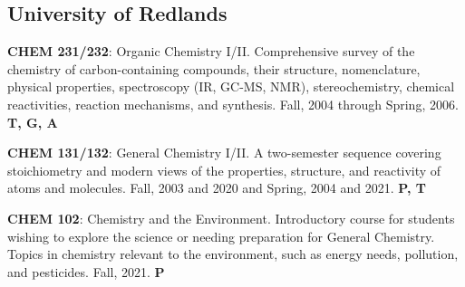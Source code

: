 \documentclass[11pt]{article}
\newcommand{\teitem}[4]{\textbf{#1}: #2 #3 \textbf{#4}}
\newcommand{\lectitem}[2]{\textbf{#1} #2}
\begin{document}
\subsection{University of Redlands}


\teitem{CHEM 231/232}{Organic Chemistry I/II. Comprehensive survey of the chemistry of carbon-containing compounds, their structure, nomenclature, physical properties, spectroscopy (IR, GC-MS, NMR), stereochemistry, chemical reactivities, reaction mechanisms, and synthesis.}{Fall, 2004 through Spring, 2006.}{T, G, A}

\teitem{CHEM 131/132}{General Chemistry I/II.  A two-semester sequence covering stoichiometry and modern views of the properties, structure, and reactivity of atoms and molecules.}{Fall, 2003 and 2020 and Spring, 2004 and 2021.}{P, T}

\teitem{CHEM 102}{Chemistry and the Environment. Introductory course for students wishing to explore the science or needing preparation for General Chemistry. Topics in chemistry relevant to the environment, such as energy needs, pollution, and pesticides.}{Fall, 2021.}{P}


\begin{comment}
\section{Invited Guest Lectures}

\lectitem{How Do You Know?}{University of Redlands Seminar. Department of Chemistry, University of Redlands, Redlands, California. January, 2020.}

\lectitem{Chemistry Through Computers.}{7th Grade Science Lecture. Blessed Sacrament Parish School, San Diego, California. January, 2015.}

\lectitem{Chemistry: College, Grad School, and Beyond.}{Guest Science Lecture. Citrus Valley High School, Redlands, California. May, 2012.}

\lectitem{Using Computers in Drug Discovery.}{University of Redlands Seminar. Department of Chemistry, University of Redlands, Redlands, California. January, 2011.}
\end{comment}
\end{document}
